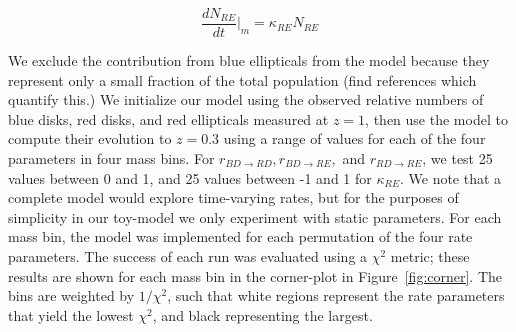 \documentclass[useAMS,usenatbib]{mn2e}
\begin{document}
\begin{equation}
\frac{dN_{RE}}{dt}\Big\rvert_{m} = \kappa_{RE} N_{RE}  
\label{eqn:RE}
\end{equation}

We exclude the contribution from blue ellipticals from the model because they represent only a small fraction of the total population (find references which quantify this.) We initialize our model using the observed relative numbers of blue disks, red disks, and red ellipticals measured at $z=1$, then use the model to compute their evolution to $z=0.3$ using a range of values for each of the four parameters in four mass bins. For $r_{BD \rightarrow RD}, r_{BD \rightarrow RE},$ and $r_{RD \rightarrow RE}$, we test 25 values between 0 and 1, and 25 values between -1 and 1 for $\kappa_{RE}$. We note that a complete model would explore time-varying rates, but for the purposes of simplicity in our toy-model we only experiment with static parameters. For each mass bin, the model was implemented for each permutation of the four rate parameters. The success of each run was evaluated using a $\chi^2$ metric; these results are shown for each mass bin in the corner-plot in Figure~\ref{fig:corner}. The bins are weighted by $1/\chi^2$, such that white regions represent the rate parameters that yield the lowest $\chi^2$, and black representing the largest.
\end{document}
